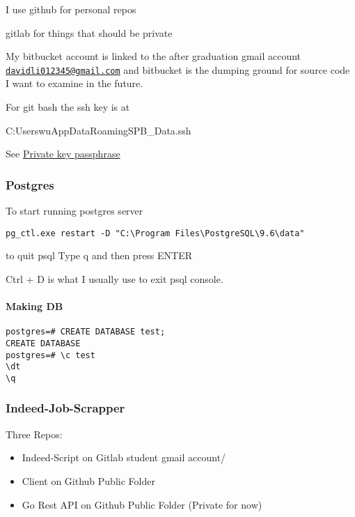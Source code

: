 I use github for personal repos

gitlab for things that should be private

My bitbucket account is linked to the after graduation gmail account
\href{mailto:davidli012345@gmail.com}{\nolinkurl{davidli012345@gmail.com}}
and bitbucket is the dumping ground for source code I want to examine in
the future.

For git bash the ssh key is at

C:UserswuAppDataRoamingSPB\_Data.ssh

See
\href{https://serverfault.com/questions/50775/how-do-i-change-my-private-key-passphrase}{Private key passphrase}


\subsubsection{Postgres}\label{postgres}

To start running postgres server

\begin{verbatim}
pg_ctl.exe restart -D "C:\Program Files\PostgreSQL\9.6\data"
\end{verbatim}

to quit psql Type q and then press ENTER

Ctrl + D is what I usually use to exit psql console.


\paragraph{Making DB}\label{making-db}

\begin{verbatim}
postgres=# CREATE DATABASE test;
CREATE DATABASE
postgres=# \c test 
\dt 
\q
\end{verbatim}


\subsubsection{Indeed-Job-Scrapper}\label{indeed-job-scrapper}

Three Repos:

\begin{itemize}
\tightlist
\item
  Indeed-Script on Gitlab student gmail account/
\item
  Client on Github Public Folder
\item
  Go Rest API on Github Public Folder (Private for now)
\end{itemize}


